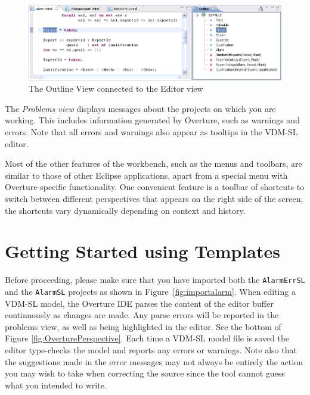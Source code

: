 {\begin{figure}[!htb]
\begin{center}
  \includegraphics[width=4.5in]{figures/OutlineView}
  \caption[labelInTOC]{The Outline View connected to the Editor view}
  \label{fig:OutlineView}
\end{center}
\end{figure}

The \emph{Problems view} displays messages about the projects on which
you are working. This includes information generated by Overture, such
as warnings and errors. Note that all errors and warnings also appear
as tooltips in the VDM-SL editor.

Most of the other features of the workbench, such as the menus and
toolbars, are similar to those of other Eclipse applications, apart
from a special menu with Overture-specific functionality. One
convenient feature is a toolbar of shortcuts to switch between
different perspectives that appears on the right side of the screen;
the shortcuts vary dynamically depending on context and history.

\section{Getting Started using Templates}\label{sec:templates}

Before proceeding, please make sure that you have imported both the
\texttt{AlarmErrSL} and the \texttt{AlarmSL} projects as shown in
Figure~\ref{fig:importalarm}. 
When editing a VDM-SL model, the Overture IDE parses the content of the
editor buffer continuously as changes are made. Any parse errors will
be reported in the problems view, as well as being highlighted in the
editor. See the bottom of Figure
\ref{fig:OverturePerspective}. Each time a VDM-SL model file is
saved the editor type-checks the model and reports any errors or
warnings. Note also that the suggestions made in the error messages
may not always be entirely the action you may wish to take when
correcting the source since the tool cannot guess what you intended
to write.

}
